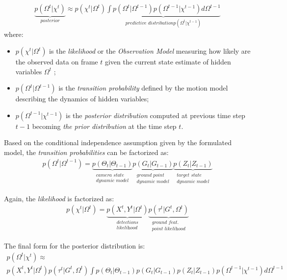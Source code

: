 \begin{eqnarray} \label{eqn: Posterior Distribution MTT}
\underbrace{p(\Omega^{t} |\chi^{t} )}_{ \textit{posterior} } \approx  p(\chi^{t} |\Omega^{t} )
\underbrace{ \int p(\Omega^{t} | \Omega^{t-1} )p(\Omega^{t-1} |\chi^{t-1}) d\Omega^{t-1} }_{ \textit{predictive distribution} p(\Omega^{t} |\chi^{t-1}) }
\end{eqnarray}
where:
\begin{itemize}
\item $ p(\chi^{t} | \Omega^{t} )$ is the \textit{likelihood} or the \textit{Observation Model} measuring how likely are the observed data on frame $t$ given the current state estimate of hidden variables $\Omega^{t}$ ;  
\item $p(\Omega^{t} |\Omega^{t-1} )$ is the \textit{transition probability} defined by the motion model describing the dynamics of hidden variables;
\item $p(\Omega^{t-1} |\chi^{t-1} )$ is the \textit{posterior distribution} computed at previous time step $t-1$ becoming \textit{the prior distribution} at the time step $t$.
\end{itemize}

Based on the conditional independence assumption given by the formulated model, 
 the \textit{transition probabilities} can be factorized as:
\begin{eqnarray}\label{eqn: transition factorized}
p(\Omega^{t} |\Omega^{t-1} ) = 
\underbrace{p(\Theta_{t} |\Theta_{t-1} )}_{\substack{\textit{camera state} \\ \textit{dynamic model}}}
\underbrace{ p(G_t |G_{t−1}) }_{\substack{\textit{ground point} \\ \textit{dynamic model}}}
\underbrace{ p(Z_t |Z_{t−1}) }_{\substack{\textit{target state} \\ \textit{dynamic model}}}
\end{eqnarray}

Again, the \textit{likelihood} is factorized as:
\begin{eqnarray} \label{eqn: likelihood factorized}
p(\chi^{t} | \Omega^{t} )= 
\underbrace{ p(X^{t}, Y^t | \Omega^{t} )}_{\substack{\textit{detections} \\ \textit{likelihood}}}
 \underbrace{p(\tau^{t} | G^t , \Omega^{t} )}_{\substack{\textit{ground feat.} \\ \textit{point likelihood} }}
\end{eqnarray}

The final form for the posterior distribution is: 
\begin{eqnarray} \label{eqn: Posterior Distribution MTT 2}
p(\Omega^{t} |\chi^{t}) \approx \\
p(X^{t}, Y^t |\Omega^{t}) p(\tau^{t} | G^t ,\Omega^{t}) 
\int p(\Theta_{t} |\Theta_{t-1}) p(G_t |G_{t−1}) p(Z_t |Z_{t−1}) \nonumber
p(\Omega^{t-1}|\chi^{t-1}) d\Omega^{t-1}
\end{eqnarray}

